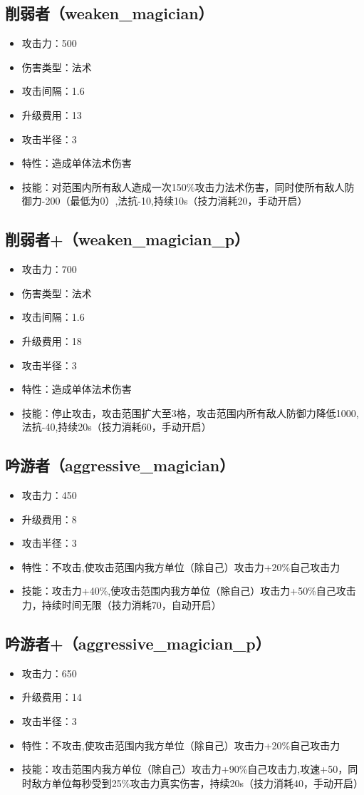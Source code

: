		\subsection{削弱者（weaken\_magician）}
			\begin{itemize}
				\item 攻击力：500
				\item 伤害类型：法术
				\item 攻击间隔：1.6
				\item 升级费用：13
				\item 攻击半径：3
				\item 特性：造成单体法术伤害
				\item 技能：对范围内所有敌人造成一次150\%攻击力法术伤害，同时使所有敌人防御力-200（最低为0）,法抗-10,持续10s（技力消耗20，手动开启）
			\end{itemize}
		\subsection{削弱者+（weaken\_magician\_p）}
			\begin{itemize}
				\item 攻击力：700
				\item 伤害类型：法术
				\item 攻击间隔：1.6
				\item 升级费用：18
				\item 攻击半径：3
				\item 特性：造成单体法术伤害
				\item 技能：停止攻击，攻击范围扩大至3格，攻击范围内所有敌人防御力降低1000,法抗-40,持续20s（技力消耗60，手动开启）
			\end{itemize}
		\subsection{吟游者（aggressive\_magician）}
			\begin{itemize}
				\item 攻击力：450
				\item 升级费用：8
				\item 攻击半径：3
				\item 特性：不攻击,使攻击范围内我方单位（除自己）攻击力+20\%自己攻击力
				\item 技能：攻击力+40\%,使攻击范围内我方单位（除自己）攻击力+50\%自己攻击力，持续时间无限（技力消耗70，自动开启）
			\end{itemize}
		\subsection{吟游者+（aggressive\_magician\_p）}
			\begin{itemize}
				\item 攻击力：650
				\item 升级费用：14
				\item 攻击半径：3
				\item 特性：不攻击,使攻击范围内我方单位（除自己）攻击力+20\%自己攻击力
				\item 技能：攻击范围内我方单位（除自己）攻击力+90\%自己攻击力,攻速+50，同时敌方单位每秒受到25\%攻击力真实伤害，持续20s（技力消耗40，手动开启）
			\end{itemize}	
